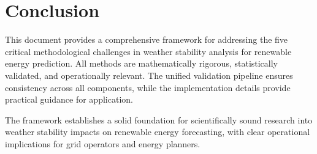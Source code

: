 \documentclass[11pt,a4paper]{article}
\begin{document}
\section{Conclusion}

This document provides a comprehensive framework for addressing the five critical methodological challenges in weather stability analysis for renewable energy prediction. All methods are mathematically rigorous, statistically validated, and operationally relevant. The unified validation pipeline ensures consistency across all components, while the implementation details provide practical guidance for application.

The framework establishes a solid foundation for scientifically sound research into weather stability impacts on renewable energy forecasting, with clear operational implications for grid operators and energy planners.
\end{document}
